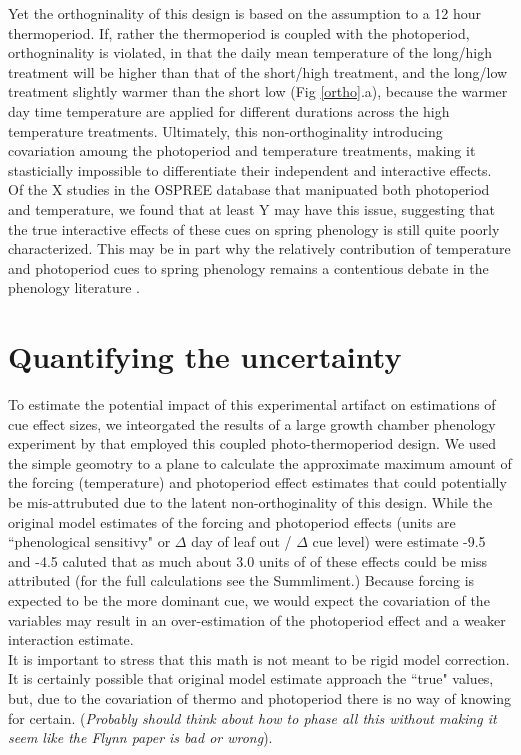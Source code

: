 \documentclass[11pt]{article}
\begin{document}
Yet the orthogninality of this design is based on the assumption to a 12 hour thermoperiod. If, rather the thermoperiod is coupled with the photoperiod, orthogninality is violated, in that the daily mean temperature of the long/high treatment will be higher than that of the short/high treatment, and the long/low treatment slightly warmer than the short low (Fig \ref{ortho}.a), because the warmer day time temperature are applied for different durations across the high temperature treatments. Ultimately, this non-orthoginality introducing covariation amoung the photoperiod and temperature treatments, making it stasticially impossible to differentiate their independent and interactive effects.\\

Of the X studies in the OSPREE database that manipuated both photoperiod and temperature, we found that at least  Y may have this issue, suggesting that the true interactive effects of these cues on spring phenology is still quite poorly characterized. This may be in part why the relatively contribution of temperature and photoperiod cues to spring phenology remains a contentious debate in the phenology literature \citep{}.

\section*{Quantifying the uncertainty}
To estimate the potential impact of this experimental artifact on estimations of cue effect sizes, we inteorgated the results of a large growth chamber phenology experiment by \citet{} that employed this coupled photo-thermoperiod design. We used the simple geomotry to a plane to calculate the approximate maximum amount of the forcing (temperature) and photoperiod effect estimates that could potentially be mis-attrubuted due to the latent non-orthoginality of this design. While the original model estimates of the forcing and photoperiod effects (units are ``phenological sensitivy" or $\Delta$ day of leaf out / $\Delta$ cue level) were estimate -9.5 and -4.5  caluted that as much about 3.0 units of of these effects could be miss attributed (for the full calculations see the Summliment.) Because  forcing is expected to be the more dominant cue, we would expect the covariation of the variables may result in an over-estimation of the photoperiod effect and a weaker interaction estimate. \\

It is important to stress that this math is not meant to be rigid model correction. It is certainly possible that original model estimate approach the ``true" values,  but, due to the covariation of thermo and photoperiod there is no way of knowing for certain. (\textit{Probably should think about how to phase all this without making it seem like the Flynn paper is bad or wrong}).\\
\end{document}
